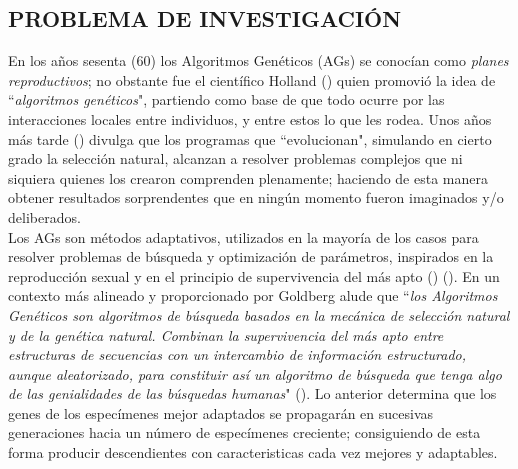 \begin{center}
	\section{PROBLEMA DE INVESTIGACIÓN}
\end{center}


En los años sesenta (60) los Algoritmos Gen\'eticos (AGs) se conocían como \textit{planes reproductivos}; no obstante fue el científico Holland (\cite{Holland1975}) quien promovió la idea de ``\textit{algoritmos genéticos}", partiendo como base de que todo ocurre por las interacciones locales entre individuos, y entre estos lo que les rodea.  Unos años más tarde  (\cite{Holland1992}) divulga que los programas que ``evolucionan", simulando en cierto grado la selección natural, alcanzan a resolver problemas complejos que ni siquiera quienes los crearon comprenden plenamente; haciendo de esta manera obtener resultados sorprendentes que en ningún momento fueron imaginados y/o deliberados.\\

Los AGs son m\'etodos adaptativos, utilizados en la mayor\'ia de los casos para resolver problemas de b\'usqueda y optimizaci\'on de par\'ametros,  inspirados en la reproducci\'on sexual y en el principio de supervivencia del m\'as apto (\cite{Fogel2000}) (\cite{Fogel2006}). En un contexto m\'as alineado y proporcionado por Goldberg alude que ``\textit{los Algoritmos Gen\'eticos son algoritmos de b\'usqueda basados en la mec\'anica de selecci\'on natural y de la gen\'etica natural. Combinan la supervivencia del m\'as apto entre estructuras de secuencias con un intercambio de informaci\'on estructurado, aunque aleatorizado, para constituir as\'i un algoritmo de b\'usqueda que tenga algo de las genialidades de las b\'usquedas humanas}" (\cite{Goldberg1989}). Lo anterior determina que los genes de los especímenes mejor adaptados se propagarán en sucesivas generaciones hacia un número de especímenes creciente; consiguiendo de esta forma producir descendientes con caracteristicas cada vez mejores y adaptables.\\

